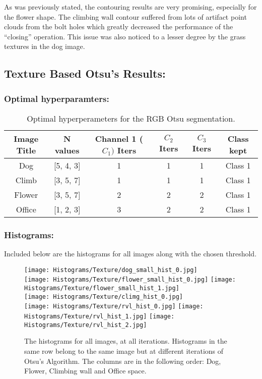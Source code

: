 \documentclass{article}
\begin{document}
As was previously stated, the contouring results are very promising, especially for the flower shape. The climbing wall contour suffered from 
lots of artifact point clouds from the bolt holes which greatly decreased the performance of the ``closing'' operation. This issue was 
also noticed to a lesser degree by the grass textures in the dog image.

\subsection{Texture Based Otsu's Results:}
\subsubsection{Optimal hyperparamters:}
\begin{table}[H]
    \centering
    \begin{tabular}{|c|c|c|c|c|c|}
        \hline
        \textbf{Image Title} & \textbf{N values} & \textbf{Channel 1 ($C_1)$ Iters} & \textbf{$C_2$ Iters} & \textbf{$C_3$ Iters} & \textbf{Class kept} \\
        \hline
        Dog & [5, 4, 3] & 1 & 1 & 1 & Class 1 \\
        \hline
        Climb & [3, 5, 7] & 1 & 1 & 1 & Class 1 \\
        \hline
        Flower & [3, 5, 7] & 2 & 2 & 2 & Class 1 \\
        \hline
        Office & [1, 2, 3] & 3 & 2 & 2 & Class 1 \\
        \hline
    \end{tabular}
    \caption{Optimal hyperperameters for the RGB Otsu segmentation.}
    \label{tab:Text7re-hyperparamters}
\end{table}

\subsubsection{Histograms:}
Included below are the histograms for all images along with the chosen threshold.
\begin{figure}[H]
    \centering
    \texttt{[image: Histograms/Texture/dog\_small\_hist\_0.jpg]} \\
    \texttt{[image: Histograms/Texture/flower\_small\_hist\_0.jpg]}
    \texttt{[image: Histograms/Texture/flower\_small\_hist\_1.jpg]} \\
    \texttt{[image: Histograms/Texture/climg\_hist\_0.jpg]} \\
    \texttt{[image: Histograms/Texture/rvl\_hist\_0.jpg]}
    \texttt{[image: Histograms/Texture/rvl\_hist\_1.jpg]}
    \texttt{[image: Histograms/Texture/rvl\_hist\_2.jpg]}
    \caption{The histograms for all images, at all iterations. Histograms in the same row belong to the same image but at different iterations of Otsu's Algorithm.
    The columns are in the following order: Dog, Flower, Climbing wall and Office space.}
\end{figure}
\end{document}
